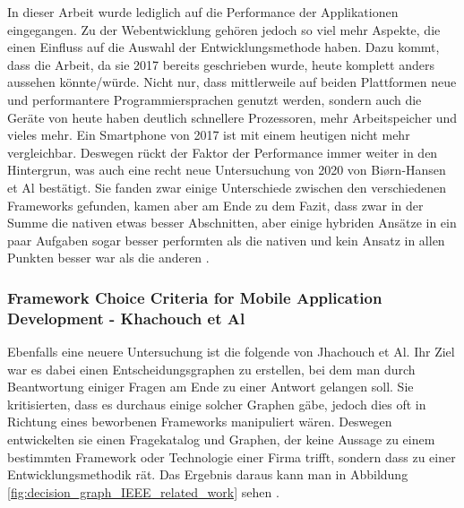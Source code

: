 In dieser Arbeit wurde lediglich auf die Performance der Applikationen eingegangen. Zu der Webentwicklung gehören jedoch so viel mehr Aspekte, die einen Einfluss auf die Auswahl der Entwicklungsmethode haben. Dazu kommt, dass die Arbeit, da sie 2017 bereits geschrieben wurde, heute komplett anders aussehen könnte/würde. Nicht nur, dass mittlerweile auf beiden Plattformen neue und performantere Programmiersprachen genutzt werden, sondern auch die Geräte von heute haben deutlich schnellere Prozessoren, mehr Arbeitspeicher und vieles mehr. Ein Smartphone von 2017 ist mit einem heutigen nicht mehr vergleichbar. Deswegen rückt der Faktor der Performance immer weiter in den Hintergrun, was auch eine recht neue Untersuchung von 2020 von Bi{\o}rn-Hansen et Al bestätigt. Sie fanden zwar einige Unterschiede zwischen den verschiedenen Frameworks gefunden, kamen aber am Ende zu dem Fazit, dass zwar in der Summe die nativen etwas besser Abschnitten, aber einige hybriden Ansätze in ein paar Aufgaben sogar besser performten als die nativen und kein Ansatz in allen Punkten besser war als die anderen \cite{BirnHansen.2020}.

\subsubsection{Framework Choice Criteria for Mobile Application Development - Khachouch et Al}
Ebenfalls eine neuere Untersuchung ist die folgende von Jhachouch et Al. Ihr Ziel war es dabei einen Entscheidungsgraphen zu erstellen, bei dem man durch Beantwortung einiger Fragen am Ende zu einer Antwort gelangen soll. Sie kritisierten, dass es durchaus einige solcher Graphen gäbe, jedoch dies oft in Richtung eines beworbenen Frameworks manipuliert wären. Deswegen entwickelten sie einen Fragekatalog und Graphen, der keine Aussage zu einem bestimmten Framework oder Technologie einer Firma trifft, sondern dass zu einer Entwicklungsmethodik rät. Das Ergebnis daraus kann man in Abbildung \ref{fig:decision_graph_IEEE_related_work} sehen \cite{IEEE_Khackouch_Al}.

